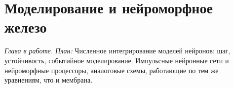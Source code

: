 \chapter{Моделирование и нейроморфное железо}
\label{sec:models}

\emph{Глава в работе. План:} Численное интегрирование моделей нейронов: шаг, устойчивость, событийное моделирование. Импульсные нейронные сети и нейроморфные процессоры, аналоговые схемы, работающие по тем же уравнениям, что и мембрана.
